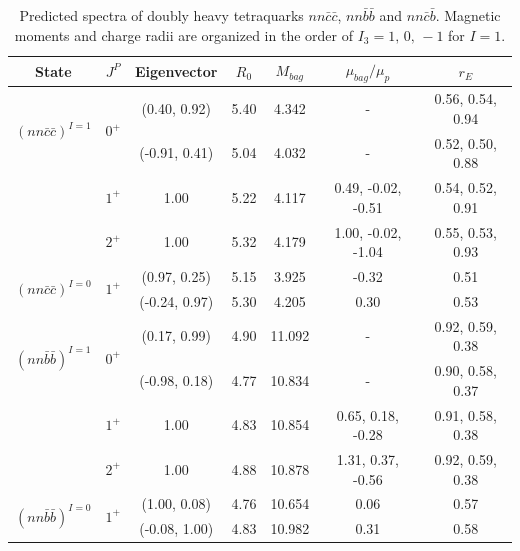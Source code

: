 \documentclass[prd,twocolumn,floatfix,nofootinbib]{revtex4}
\begin{document}
\renewcommand{\tabcolsep}{0.59cm}
\renewcommand{\arraystretch}{1.2}
\begin{table}[!htbp]
    \caption{Predicted spectra of doubly heavy tetraquarks $nn\bar{c}\bar{c}$, $nn\bar{b}\bar{b}$ and $nn\bar{c}\bar{b}$. 
    Magnetic moments and charge radii are organized in the order of $I_{3}=1,\,0,\,-1$ for $I=1$.}
    \label{tab:2heavytetraquark1}
    \begin{tabular}{ccccccc}
        \hline\hline
        {\rm State}     &$J^{P}$    &{\rm Eigenvector}      &$R_{0}$    &$M_{bag}$  &$\mu_{bag}/\mu_{p}$    &$r_{E}$ \\ \hline
        \multirow{2}{*}{${(nn\bar{c}\bar{c})}^{I=1}$}
                        &\multirow{2}{*}{$0^{+}$}
                                    &(0.40, 0.92)           &5.40	    &4.342	    &-                      &0.56, 0.54, 0.94 \\ 
                        &           &(-0.91, 0.41)          &5.04	    &4.032	    &-                      &0.52, 0.50, 0.88 \\ 
                        &$1^{+}$    &1.00                   &5.22	    &4.117	    &0.49, -0.02, -0.51     &0.54, 0.52, 0.91 \\ 
                        &$2^{+}$    &1.00                   &5.32	    &4.179	    &1.00, -0.02, -1.04     &0.55, 0.53, 0.93 \\ 
        \multirow{2}{*}{${(nn\bar{c}\bar{c})}^{I=0}$}
                        &\multirow{2}{*}{$1^{+}$}
                                    &(0.97, 0.25)           &5.15	    &3.925	    &-0.32                  &0.51 \\ 
                        &           &(-0.24, 0.97)          &5.30	    &4.205	    &0.30                   &0.53 \\ 
        \multirow{2}{*}{${(nn\bar{b}\bar{b})}^{I=1}$}
                        &\multirow{2}{*}{$0^{+}$}
                                    &(0.17, 0.99)           &4.90	    &11.092	    &-                      &0.92, 0.59, 0.38 \\ 
                        &           &(-0.98, 0.18)          &4.77	    &10.834	    &-                      &0.90, 0.58, 0.37 \\ 
                        &$1^{+}$    &1.00                   &4.83	    &10.854	    &0.65, 0.18, -0.28      &0.91, 0.58, 0.38 \\ 
                        &$2^{+}$    &1.00                   &4.88	    &10.878	    &1.31, 0.37, -0.56      &0.92, 0.59, 0.38 \\ 
        \multirow{2}{*}{${(nn\bar{b}\bar{b})}^{I=0}$}
                        &\multirow{2}{*}{$1^{+}$}
                                    &(1.00, 0.08)           &4.76	    &10.654	    &0.06                   &0.57 \\ 
                        &           &(-0.08, 1.00)          &4.83	    &10.982	    &0.31                   &0.58 \\ 


\end{tabular}
\end{table}
\end{document}
